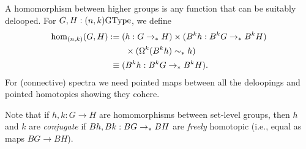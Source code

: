 A homomorphism between higher groups is any
function that can be suitably delooped.
For $G,H : (n,k)\mathrm{GType}$, we define
\begin{align*}
\hom_{(n,k)}(G,H) & := 
(h: G \to_\ast H)\times (B^k h: B^kG \to_\ast B^kH) \\
& \qquad \times (\Omega^k(B^k h) \sim_\ast h) \\
&\phantom{:}\equiv (B^k h: B^kG \to_\ast B^kH).
\end{align*}
For (connective) spectra we need
pointed maps between all the deloopings and pointed homotopies showing
they cohere.

Note that if $h,k : G \to H$ are homomorphisms between set-level
groups, then $h$ and $k$ are \emph{conjugate} if $Bh, Bk : BG \to_\ast BH$ are
\emph{freely} homotopic (i.e., equal as maps $BG \to BH$).

